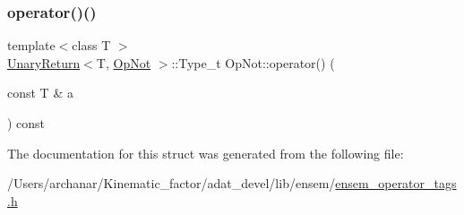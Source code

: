 \mbox{\label{structOpNot_ac76618313170c606b7fb1ca1c2b0f164}} 
\subsubsection{\texorpdfstring{operator()()}{operator()()}\hspace{0.1cm}{\footnotesize\ttfamily [2/2]}}
{\footnotesize\ttfamily template$<$class T $>$ \\
\mbox{\hyperlink{structUnaryReturn}{Unary\+Return}}$<$T, \mbox{\hyperlink{structOpNot}{Op\+Not}} $>$\+::Type\+\_\+t Op\+Not\+::operator() (\begin{DoxyParamCaption}\item[{const T \&}]{a }\end{DoxyParamCaption}) const\hspace{0.3cm}{\ttfamily [inline]}}



The documentation for this struct was generated from the following file\+:\begin{DoxyCompactItemize}
\item 
/\+Users/archanar/\+Kinematic\+\_\+factor/adat\+\_\+devel/lib/ensem/\mbox{\hyperlink{lib_2ensem_2ensem__operator__tags_8h}{ensem\+\_\+operator\+\_\+tags.\+h}}\end{DoxyCompactItemize}
